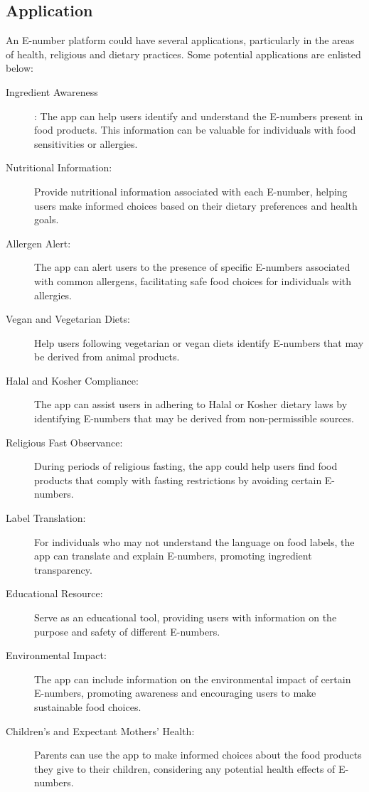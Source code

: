 \documentclass[a4paper,12pt]{report}
\begin{document}
\subsection*{Application}
An E-number platform could have several applications, particularly in the areas of health, religious and dietary practices. Some potential applications are enlisted below:
\begin{description}
	\item [Ingredient Awareness]: The app can help users identify and understand the E-numbers present in food products. This information can be valuable for individuals with food sensitivities or allergies.
	\item [Nutritional Information:] Provide nutritional information associated with each E-number, helping users make informed choices based on their dietary preferences and health goals.
	\item[Allergen Alert:] The app can alert users to the presence of specific E-numbers associated with common allergens, facilitating safe food choices for individuals with allergies.
	\item[Vegan and Vegetarian Diets:] Help users following vegetarian or vegan diets identify E-numbers that may be derived from animal products.
	\item[Halal and Kosher Compliance:] The app can assist users in adhering to Halal or Kosher dietary laws by identifying E-numbers that may be derived from non-permissible sources.
	\item[Religious Fast Observance:] During periods of religious fasting, the app could help users find food products that comply with fasting restrictions by avoiding certain E-numbers.
	\item[Label Translation:] For individuals who may not understand the language on food labels, the app can translate and explain E-numbers, promoting ingredient transparency.
	\item[Educational Resource:] Serve as an educational tool, providing users with information on the purpose and safety of different E-numbers.
	\item[Environmental Impact:]
		The app can include information on the environmental impact of certain E-numbers, promoting awareness and encouraging users to make sustainable food choices.
	\item[	Children's and Expectant Mothers' Health:] Parents can use the app to make informed choices about the food products they give to their children, considering any potential health effects of E-numbers.

\end{description}
\end{document}
